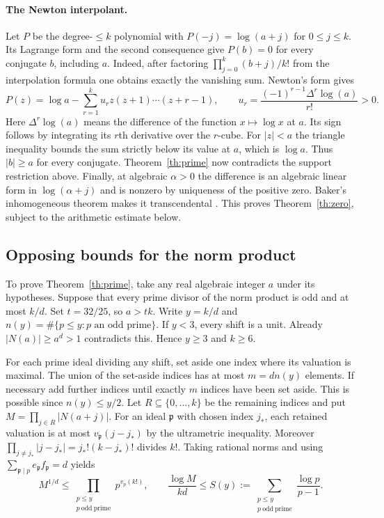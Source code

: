 \documentclass[11pt,a4paper]{article}
\theoremstyle{definition}\newtheorem{definition}[theorem]{Definition}\newtheorem{example}[theorem]{Example}
\theoremstyle{remark}\newtheorem{remark}[theorem]{Remark}
\begin{document}
\paragraph{The Newton interpolant.}
Let $P$ be the degree-$\le k$ polynomial with $P(-j)=\log(a+j)$ for $0\le j\le k$. Its Lagrange form and the second consequence give $P(b)=0$ for every conjugate $b$, including $a$. Indeed, after factoring $\prod_{j=0}^k(b+j)/k!$ from the interpolation formula one obtains exactly the vanishing sum. Newton's form gives
\[
 P(z)=\log a-\sum_{r=1}^k u_r z(z+1)\cdots(z+r-1),\qquad
 u_r=\frac{(-1)^{r-1}\Delta^r\log(a)}{r!}>0.
\]
Here $\Delta^r\log(a)$ means the difference of the function $x\mapsto\log x$ at $a$. Its sign follows by integrating its $r$th derivative over the $r$-cube. For $|z|<a$ the triangle inequality bounds the sum strictly below its value at $a$, which is $\log a$. Thus $|b|\ge a$ for every conjugate. Theorem~\ref{th:prime} now contradicts the support restriction above. Finally, at algebraic $\alpha>0$ the difference is an algebraic linear form in $\log(\alpha+j)$ and is nonzero by uniqueness of the positive zero. Baker's inhomogeneous theorem makes it transcendental \cite{Baker}. This proves Theorem~\ref{th:zero}, subject to the arithmetic estimate below.
\subsection{Opposing bounds for the norm product}
To prove Theorem~\ref{th:prime}, take any real algebraic integer $a$ under its hypotheses. Suppose that every prime divisor of the norm product is odd and at most $k/d$. Set $t=32/25$, so $a>tk$. Write $y=k/d$ and $n(y)=\#\{p\le y:p\text{ an odd prime}\}$. If $y<3$, every shift is a unit. Already $|N(a)|\ge a^d>1$ contradicts this. Hence $y\ge3$ and $k\ge6$.

For each prime ideal dividing any shift, set aside one index where its valuation is maximal. The union of the set-aside indices has at most $m=dn(y)$ elements. If necessary add further indices until exactly $m$ indices have been set aside. This is possible since $n(y)\le y/2$. Let $R\subseteq\{0,\ldots,k\}$ be the remaining indices and put $M=\prod_{j\in R}|N(a+j)|$. For an ideal $\mathfrak p$ with chosen index $j_*$, each retained valuation is at most $v_{\mathfrak p}(j-j_*)$ by the ultrametric inequality. Moreover $\prod_{j\ne j_*}|j-j_*|=j_*!(k-j_*)!$ divides $k!$. Taking rational norms and using $\sum_{\mathfrak p\mid p}e_{\mathfrak p}f_{\mathfrak p}=d$ yields
\[
 M^{1/d}\le\prod_{\substack{p\le y\\p\ \mathrm{odd\ prime}}}p^{v_p(k!)},
 \qquad \frac{\log M}{kd}\le S(y):=
 \sum_{\substack{p\le y\\p\ \mathrm{odd\ prime}}}\frac{\log p}{p-1}.
\]
\end{document}
